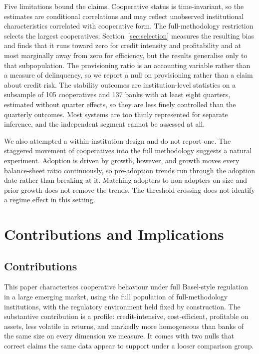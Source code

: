 \documentclass[11pt,a4paper]{article}
\begin{document}
Five limitations bound the claims. Cooperative status is time-invariant, so the estimates
are conditional correlations and may reflect unobserved institutional characteristics
correlated with cooperative form. The full-methodology restriction selects the largest
cooperatives; Section~\ref{sec:selection} measures the resulting bias and finds that it
runs toward zero for credit intensity and profitability and at most marginally away from
zero for efficiency, but the results generalise only to that subpopulation. The
provisioning ratio is an accounting variable rather than a measure of delinquency, so we
report a null on provisioning rather than a claim about credit risk. The stability
outcomes are institution-level statistics on a subsample of 105 cooperatives and 137
banks with at least eight quarters, estimated without quarter effects, so they are less
finely controlled than the quarterly outcomes. Most systems are too thinly represented
for separate inference, and the independent segment cannot be assessed at all.

We also attempted a within-institution design and do not report one. The staggered
movement of cooperatives into the full methodology suggests a natural experiment.
Adoption is driven by growth, however, and growth moves every balance-sheet ratio
continuously, so pre-adoption trends run through the adoption date rather than breaking
at it. Matching adopters to non-adopters on size and prior growth does not remove the
trends. The threshold crossing does not identify a regime effect in this setting.

\section{Contributions and Implications}

\subsection{Contributions}

This paper characterises cooperative behaviour under full Basel-style regulation in a
large emerging market, using the full population of full-methodology institutions, with
the regulatory environment held fixed by construction. The substantive contribution is a
profile: credit-intensive, cost-efficient, profitable on assets, less volatile in
returns, and markedly more homogeneous than banks of the same size on every dimension we
measure. It comes with two nulls that correct claims the same data appear to support
under a looser comparison group.
\end{document}
